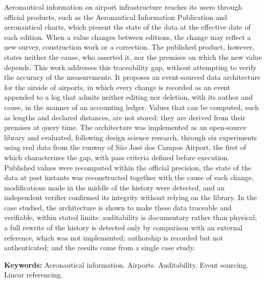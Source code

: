 Aeronautical information on airport infrastructure reaches its users through official products, such as the Aeronautical Information Publication and aeronautical charts, which present the state of the data at the effective date of each edition. 
When a value changes between editions, the change may reflect a new survey, construction work or a correction. The published product, however, states neither the cause, who asserted it, nor the premises on which the new value depends. This work addresses this traceability gap, without attempting to verify the accuracy of the measurements. It proposes an event-sourced data architecture for the airside of airports, in which every change is recorded as an event appended to a log that admits neither editing nor deletion, with its author and cause, in the manner of an accounting ledger. Values that can be computed, such as lengths and declared distances, are not stored: they are derived from their premises at query time. The architecture was implemented as an open-source library and evaluated, following design science research, through six experiments using real data from the runway of São José dos Campos Airport, the first of which characterizes the gap, with pass criteria defined before execution. Published values were recomputed within the official precision, the state of the data at past instants was reconstructed together with the cause of each change, modifications made in the middle of the history were detected, and an independent verifier confirmed its integrity without relying on the library. In the case studied, the architecture is shown to make these data traceable and verifiable, within stated limits: auditability is documentary rather than physical; a full rewrite of the history is detected only by comparison with an external reference, which was not implemented; authorship is recorded but not authenticated; and the results come from a single case study.

\bigskip
\noindent\textbf{Keywords:} Aeronautical information. Airports.
Auditability. Event sourcing. Linear referencing.